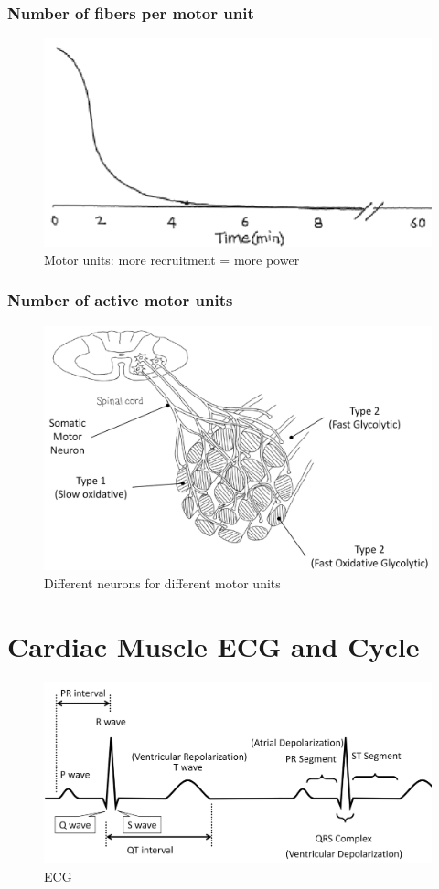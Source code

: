 \documentclass[11pt,fleqn]{book} %
\begin{document}
\subsubsection{Number of fibers per motor unit}
\begin{figure}[h!]
\begin{center}
    \includegraphics[width=0.6\linewidth]{Pictures/Screenshot 2024-04-03 231449.png}
    \caption{Motor units: more recruitment = more power}
\end{center}
\end{figure}


\subsubsection{Number of active motor units}
\begin{figure}[h!]
\begin{center}
    \includegraphics[width=0.5\linewidth]{Pictures/Screenshot 2024-04-03 232435.png}
    \caption{Different neurons for different
motor units}
\end{center}
\end{figure}

\newpage
\section{Cardiac Muscle ECG and Cycle}
\begin{figure}[h!]
\begin{center}
    \includegraphics[width=0.8\linewidth]{Pictures/Screenshot 2024-04-03 234918.png}
    \caption{ECG}
\end{center}
\end{figure}
\end{document}
